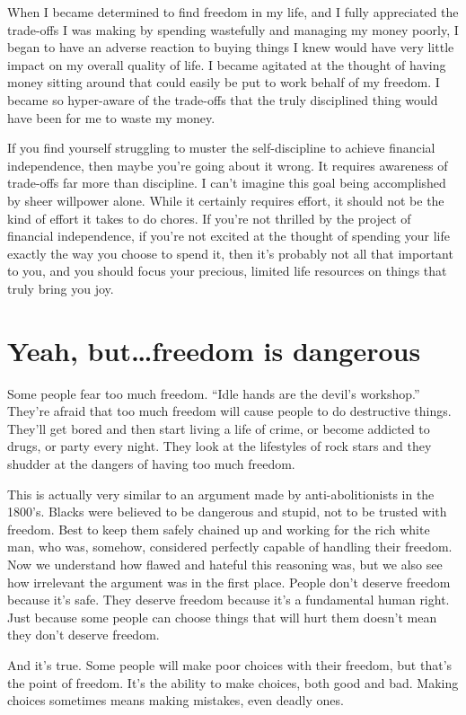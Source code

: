 When I became determined to find freedom in my life, and I fully appreciated the trade-offs I was making by spending wastefully and managing my money poorly, I began to have an adverse reaction to buying things I knew would have very little impact on my overall quality of life. I became agitated at the thought of having money sitting around that could easily be put to work behalf of my freedom. I became so hyper-aware of the trade-offs that the truly disciplined thing would have been for me to waste my money.

If you find yourself struggling to muster the self-discipline to achieve financial independence, then maybe you're going about it wrong. It requires awareness of trade-offs far more than discipline. I can't imagine this goal being accomplished by sheer willpower alone. While it certainly requires effort, it should not be the kind of effort it takes to do chores. If you're not thrilled by the project of financial independence, if you're not excited at the thought of spending your life exactly the way you choose to spend it, then it's probably not all that important to you, and you should focus your precious, limited life resources on things that truly bring you joy.

\section{Yeah, but\ldots freedom is dangerous}
Some people fear too much freedom. ``Idle hands are the devil's workshop.'' They're afraid that too much freedom will cause people to do destructive things. They'll get bored and then start living a life of crime, or become addicted to drugs, or party every night. They look at the lifestyles of rock stars and they shudder at the dangers of having too much freedom.

This is actually very similar to an argument made by anti-abolitionists in the 1800's. Blacks were believed to be dangerous and stupid, not to be trusted with freedom. Best to keep them safely chained up and working for the rich white man, who was, somehow, considered perfectly capable of handling their freedom. Now we understand how flawed and hateful this reasoning was, but we also see how irrelevant the argument was in the first place. People don't deserve freedom because it's safe. They deserve freedom because it's a fundamental human right. Just because some people can choose things that will hurt them doesn't mean they don't deserve freedom.

And it's true. Some people will make poor choices with their freedom, but that's the point of freedom. It's the ability to make choices, both good and bad. Making choices sometimes means making mistakes, even deadly ones.

